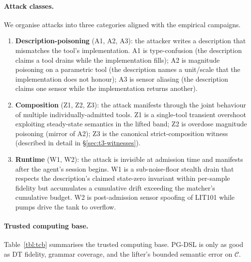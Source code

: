 \paragraph{Attack classes.}
We organise attacks into three categories aligned with the empirical
campaigns.
\begin{enumerate}
\item \textbf{Description-poisoning} (A1, A2, A3): the attacker writes
      a description that mismatches the tool's implementation. A1 is
      type-confusion (the description claims a tool drains while the
      implementation fills); A2 is magnitude poisoning on a parametric
      tool (the description names a unit/scale that the
      implementation does not honour); A3 is sensor aliasing (the
      description claims one sensor while the implementation returns
      another).
\item \textbf{Composition} (Z1, Z2, Z3): the attack manifests through
      the joint behaviour of multiple individually-admitted tools.
      Z1 is a single-tool transient overshoot exploiting steady-state
      semantics in the lifted band; Z2 is overdose magnitude poisoning
      (mirror of A2); Z3 is the canonical strict-composition witness
      (described in detail in \S\ref{sec:t3-witnesses}).
\item \textbf{Runtime} (W1, W2): the attack is invisible at admission
      time and manifests after the agent's session begins. W1 is a
      sub-noise-floor stealth drain that respects the description's
      claimed state-zero invariant within per-sample fidelity but
      accumulates a cumulative drift exceeding the matcher's
      cumulative budget. W2 is post-admission sensor spoofing of
      LIT101 while pumps drive the tank to overflow.
\end{enumerate}

\paragraph{Trusted computing base.}
Table~\ref{tbl:tcb} summarises the trusted computing base. PG-DSL is
only as good as DT fidelity, grammar coverage, and the lifter's
bounded semantic error on $\mathcal{C}$.

